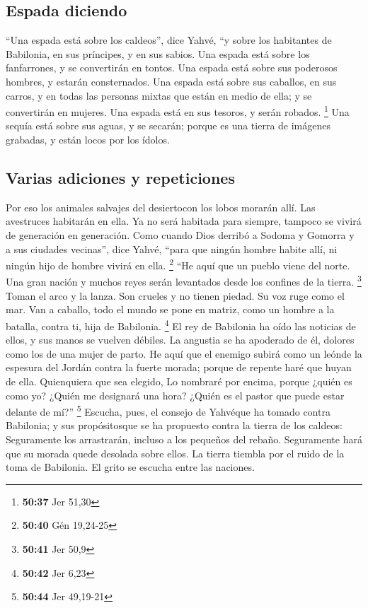\begin{paracol}{2}
\hypertarget{espada-diciendo}{%
\subsection{Espada diciendo}\label{espada-diciendo}}

 ``Una espada está sobre los caldeos'', dice Yahvé, ``y
sobre los habitantes de Babilonia, en sus príncipes, y en sus sabios.
 Una espada está sobre los fanfarrones, y se convertirán
en tontos. Una espada está sobre sus poderosos hombres, y estarán
consternados.  Una espada está sobre sus caballos, en sus
carros, y en todas las personas mixtas que están en medio de ella; y se
convertirán en mujeres. Una espada está en sus tesoros, y serán robados.
\footnote{\textbf{50:37} Jer 51,30}  Una sequía está
sobre sus aguas, y se secarán; porque es una tierra de imágenes
grabadas, y están locos por los ídolos.

\hypertarget{varias-adiciones-y-repeticiones}{%
\subsection{Varias adiciones y
repeticiones}\label{varias-adiciones-y-repeticiones}}

 Por eso los animales salvajes del desiertocon los lobos
morarán allí. Las avestruces habitarán en ella. Ya no será habitada para
siempre, tampoco se vivirá de generación en generación. 
Como cuando Dios derribó a Sodoma y Gomorra y a sus ciudades vecinas'',
dice Yahvé, ``para que ningún hombre habite allí, ni ningún hijo de
hombre vivirá en ella. \footnote{\textbf{50:40} Gén 19,24-25}
 ``He aquí que un pueblo viene del norte. Una gran nación
y muchos reyes serán levantados desde los confines de la tierra.
\footnote{\textbf{50:41} Jer 50,9}  Toman el arco y la
lanza. Son crueles y no tienen piedad. Su voz ruge como el mar. Van a
caballo, todo el mundo se pone en matriz, como un hombre a la batalla,
contra ti, hija de Babilonia. \footnote{\textbf{50:42} Jer 6,23}
 El rey de Babilonia ha oído las noticias de ellos, y sus
manos se vuelven débiles. La angustia se ha apoderado de él, dolores
como los de una mujer de parto.  He aquí que el enemigo
subirá como un leónde la espesura del Jordán contra la fuerte morada;
porque de repente haré que huyan de ella. Quienquiera que sea elegido,
Lo nombraré por encima, porque ¿quién es como yo? ¿Quién me designará
una hora? ¿Quién es el pastor que puede estar delante de mí?''
\footnote{\textbf{50:44} Jer 49,19-21}  Escucha, pues, el
consejo de Yahvéque ha tomado contra Babilonia; y sus propósitosque se
ha propuesto contra la tierra de los caldeos: Seguramente los
arrastrarán, incluso a los pequeños del rebaño. Seguramente hará que su
morada quede desolada sobre ellos.  La tierra tiembla por
el ruido de la toma de Babilonia. El grito se escucha entre las
naciones.


\end{paracol}
